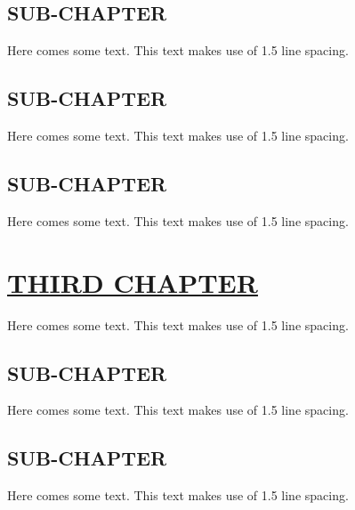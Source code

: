 \documentclass{article}
\begin{document}
{{{{{{{\subsection{SUB-CHAPTER}
Here comes some text. This text makes use of 1.5 line spacing. 
\subsection{SUB-CHAPTER}
Here comes some text. This text makes use of 1.5 line spacing. 
\subsection{SUB-CHAPTER}
Here comes some text. This text makes use of 1.5 line spacing. 
\pagebreak
\section{\uline{THIRD CHAPTER}}
Here comes some text. This text makes use of 1.5 line spacing. 
\subsection{SUB-CHAPTER}
Here comes some text. This text makes use of 1.5 line spacing. 
\subsection{SUB-CHAPTER}
Here comes some text. This text makes use of 1.5 line spacing. 
}}}}}}}
\end{document}
